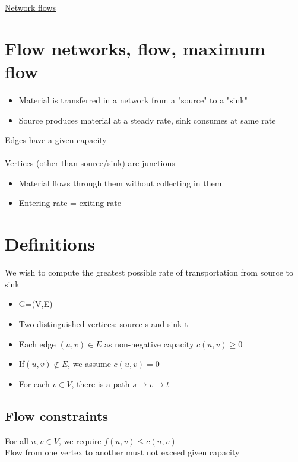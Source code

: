 \documentclass{article}[18pt]
\begin{document}
\begin{center}
\underline{\huge Network flows}
\end{center}
\section{Flow networks, flow, maximum flow}
\begin{itemize}
	\item Material is transferred in a network from a "source" to a "sink"
	\item Source produces material at a steady rate, sink consumes at same rate
\end{itemize}
Edges have a given capacity\\
\\
Vertices (other than source/sink) are junctions
\begin{itemize}
	\item Material flows through them without collecting in them
	\item Entering rate = exiting rate
\end{itemize}
\section{Definitions}
\begin{definition}
	We wish to compute the greatest possible rate of transportation from source to sink
\end{definition}

\begin{definition}
\begin{itemize}
	\item G=(V,E)
	\item Two distinguished vertices: source s and sink t
	\item Each edge $(u,v)\in E$ as non-negative capacity $c(u,v)\geqslant 0$
	\item If$(u,v)\notin E$, we assume $c(u,v)=0$
	\item For each $v\in V$, there is a path $s\rightarrow v \rightarrow t$
\end{itemize}
\end{definition}
\subsection{Flow constraints}
\begin{definition}
	For all $u,v\in V$, we require $f(u,v)\leqslant c(u,v)$\\
	Flow from one vertex to another must not exceed given capacity
\end{definition}
\end{document}
